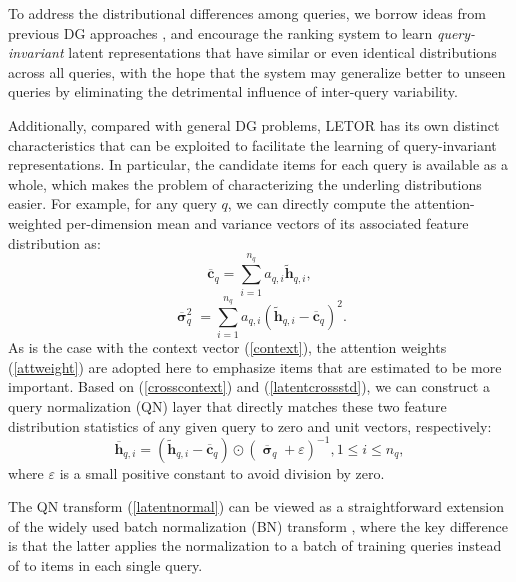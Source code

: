 \documentclass[letterpaper]{article} %
\begin{document}
To address the distributional differences among queries, we borrow ideas from previous DG approaches \cite{ganin2016domain,motiian2017unified,muandet2013domain}, and encourage the ranking system to learn \textit{query-invariant} latent representations that have similar or even identical distributions across all queries, with the hope that the system may generalize better to unseen queries by eliminating the detrimental influence of inter-query variability.

Additionally, compared with general DG problems, LETOR has its own distinct characteristics that can be exploited to facilitate the learning of query-invariant representations. In particular, the candidate items for each query is available as a whole, which makes the problem of characterizing the underling distributions easier. For example, for any query $q$, we can directly compute the attention-weighted per-dimension mean and variance vectors of its associated feature distribution as:
\begin{equation}
\label{crosscontext}
{{\overline{\mathbf{c}}}_{q}}=\sum\limits_{i=1}^{{{n}_{q}}}{{{a}_{q,i}}{{\widetilde{\mathbf{h}}}_{q,i}}},
\end{equation}
\begin{equation}
\label{latentcrossstd}
\overline{\boldsymbol{\upsigma}}_{q}^{2}=\sum\limits_{i=1}^{{{n}_{q}}}{{{a}_{q,i}}{{\left( {{\widetilde{\mathbf{h}}}_{q,i}}-{{\overline{\mathbf{c}}}_{q}} \right)}^{2}}}.
\end{equation}
As is the case with the context vector (\ref{context}), the attention weights (\ref{attweight}) are adopted here to emphasize items that are estimated to be more important. Based on (\ref{crosscontext}) and (\ref{latentcrossstd}), we can construct a query normalization (QN) layer that directly matches these two feature distribution statistics of any given query to zero and unit vectors, respectively:
\begin{equation}
\label{latentnormal}
{{\overline{\mathbf{h}}}_{q,i}}=\left( {{\widetilde{\mathbf{h}}}_{q,i}}-{{\overline{\mathbf{c}}}_{q}} \right)\odot {{\left( {{\overline{\boldsymbol{\upsigma}}}_{q}}+\varepsilon  \right)}^{-1}},1\le i\le n_{q},
\end{equation}
where $\varepsilon$ is a small positive constant to avoid division by zero.

The QN transform (\ref{latentnormal}) can be viewed as a straightforward extension of the widely used batch normalization (BN) transform \cite{ioffe2015batch}, where the key difference is that the latter applies the normalization to a batch of training queries instead of to items in each single query.
\end{document}
